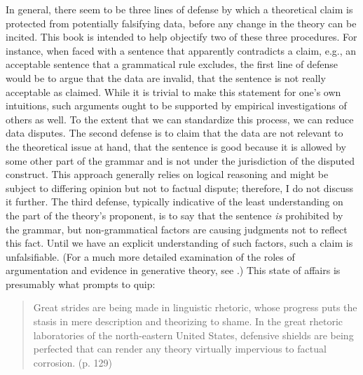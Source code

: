 In general, there seem to be three lines of defense by which a theoretical claim is protected from potentially falsifying data, before any change in the theory can be incited. This book is intended to help objectify two of these three procedures. For instance, when faced with a sentence that apparently contradicts a claim, e.g., an acceptable sentence that a grammatical rule excludes, the first line
of defense would be to argue that the data are invalid, that the sentence is not really acceptable as claimed. While it is trivial to make this statement for one's own intuitions, such arguments ought to be supported by empirical investigations of others as well. To the extent that we can standardize this process, we can reduce data disputes. The second defense is to claim that the data are not relevant to the theoretical issue at hand, that the sentence is good because it is allowed by some other part of the grammar and is not under the jurisdiction of the disputed construct. This approach generally relies on logical reasoning and might be subject to differing opinion but not to factual dispute; therefore, I do not discuss it further. The third defense, typically indicative of the least understanding on the part of the theory's proponent, is to say that the sentence \textit{is} prohibited by the grammar, but non-grammatical factors are causing judgments not to reflect this fact. Until we have an explicit understanding of such factors, such a claim is unfalsifiable. (For a much more detailed examination of the roles of argumentation and evidence in generative theory, see \citet{Botha1973}.) This state of affairs is presumably what prompts \citet{Postal1988} to quip:

\begin{quote}
Great strides are being made in linguistic rhetoric, whose progress puts the stasis in mere description and theorizing to shame. In the great rhetoric laboratories of the north-eastern United States, defensive shields are being perfected that can render any theory virtually impervious to factual corrosion. (p. 129)
\end{quote}

